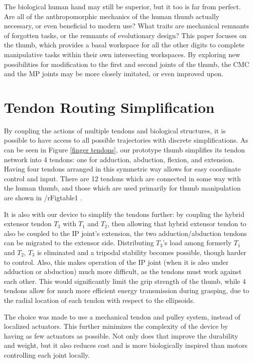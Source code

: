 \documentclass[letterpaper, 10 pt, conference]{ieeeconf}  %
\newcommand{\rFig}[1]{Figure \ref{#1}}
\begin{document}
The biological human hand may still be superior, but it too is far from perfect. Are all of the anthropomorphic mechanics of the human thumb actually necessary, or even beneficial to modern use? What traits are mechanical remnants of forgotten tasks, or the remnants of evolutionary design? This paper focuses on the thumb, which provides a basal workspace for all the other digits to complete manipulative tasks within their own intersecting workspaces. By exploring new possibilities for modification to the first and second joints of the thumb, the CMC and the MP joints may be more closely imitated, or even improved upon.

\section{Tendon Routing Simplification}

By coupling the actions of multiple tendons and biological structures, it is possible to have access to all possible trajectories with discrete simplifications. As can be seen in \rFig{finger tendons}, our prototype thumb simplifies its tendon network into 4 tendons: one for adduction, abduction, flexion, and extension. Having four tendons arranged in this symmetric way allows for easy coordinate control and input.  There are 12 tendons which are connected in some way with the human thumb, and those which are used primarily for thumb manipulation are shown in /rFig{table1} \cite{grants anatomy}.

It is also with our device to simplify the tendons further: by coupling the hybrid extensor tendon $T_3$ with $T_1$ and $T_2$, then allowing that hybrid extensor tendon to also be coupled to the IP joint's extension, the two adduction/abduction tendons can be migrated to the extensor side. Distributing $T_3$'s load among formerly $T_1$ and $T_2$, $T_3$ is eliminated and a tripodal stability becomes possible, though harder to control. Also, this makes operation of the IP joint (when it is also under adduction or abduction) much more difficult, as the tendons must work against each other. This would significantly limit the grip strength of the thumb, while 4 tendons allow for much more efficient energy transmission during grasping, due to the radial location of each tendon with respect to the ellipsoids.

The choice was made to use a mechanical tendon and pulley system, instead of localized actuators. This further minimizes the complexity of the device by having as few actuators as possible. Not only does that improve the durability and weight, but it also reduces cost and is more biologically inspired than motors controlling each joint locally.
\end{document}
